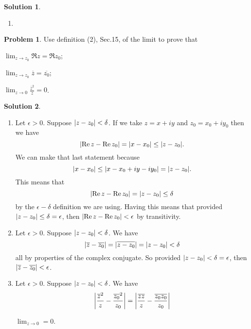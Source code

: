 \documentclass[10pt]{article}
\theoremstyle{definition}
\newtheorem{problem}{Problem}
\newtheorem{soln}{Solution}
\begin{document}
\begin{soln}
\begin{enumerate}[label=(\alph*)]
\begin{center}
\begin{tikzpicture}[scale=2]
            \end{tikzpicture}
          \end{center}
    \item ~\begin{center}
          \end{center}
  \end{enumerate}
\end{soln}
\newpage

\begin{problem}
Use definition (2), Sec.15, of the limit to prove that
\begin{center}
  \begin{enumerate*}[label=(\alph*)]
    \item $\lim_{z\to z_0}\Re z = \Re z_0$;\qquad~
    \item $\lim_{z\to z_0}\overline{z}=\overline{z_0}$;\qquad~
    \item $\lim_{z\to 0}\frac{\overline{z}^2}{z}=0$.
  \end{enumerate*}
\end{center}
\end{problem}
\begin{soln}~
  \begin{enumerate}[label=(\alph*)]
    \item Let $\epsilon>0$. Suppose $\abs{z-z_0}<\delta$. If we take $z=x+iy$ and $z_0=x_0+iy_0$ then we have
          $$\abs{\Re z-\Re z_0}=\abs{x-x_0}\leq \abs{z-z_0}.$$
          We can make that last statement because
          $$\abs{x-x_0}\leq \abs{x-x_0+iy-iy_0}=\abs{z-z_0}.$$
          This means that
          $$\abs{\Re z-\Re z_0}=\abs{z-z_0}\leq \delta$$
          by the $\epsilon-\delta$ definition we are using. Having this means that provided
          $\abs{z-z_0}\leq \delta=\epsilon$, then $\abs{\Re z-\Re z_0}<\epsilon$ by transitivity.
    \item Let $\epsilon>0$. Suppose $\abs{z-z_0}<\delta$. We have
          $$\abs{\overline{z}-\overline{z_0}}=\abs{\overline{z-z_0}}=\abs{z-z_0}<\delta$$
          all by properties of the complex conjugate. So provided $\abs{z-z_0}<\delta=\epsilon$, then
          $\abs{\overline{z}-\overline{z_0}}<\epsilon$.
    \item Let $\epsilon>0$. Suppose $\abs{z-z_0}<\delta$. We have
          $$\abs{\frac{\overline{z}^2}{z}-\frac{\overline{z_0}^2}{z_0}}=\abs{\frac{\overline{zz}}{z}-\frac{\overline{z_0z_0}}{z_0}}$$
    
    
    $\lim_{z\to 0}=0$.
  \end{enumerate}
\end{soln}
\end{document}

